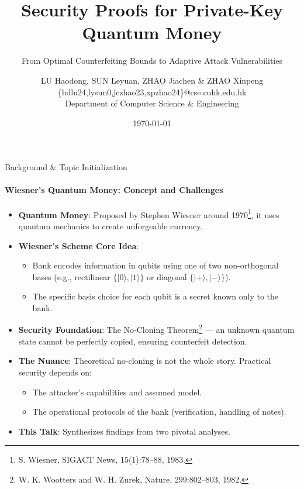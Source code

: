\documentclass{beamer}
\title[Wiesner's QM Security]{Security Proofs for Private-Key Quantum Money}
\subtitle{From Optimal Counterfeiting Bounds to Adaptive Attack Vulnerabilities}
\author[Your Short Name]{
    LU Haodong, SUN Leyuan, ZHAO Jiachen \& ZHAO Xinpeng \\
    \vspace{0.1in}
    \footnotesize{\{hdlu24,lysun0,jczhao23,xpzhao24\}@cse.cuhk.edu.hk} \\
    \footnotesize{Department of Computer Science \& Engineering}}
\institute[CUHK]{The Chinese University of Hong Kong}
\date{\today}
\begin{document}
\frame[plain]{\maketitle}


\begin{frame}{Background \& Topic Initialization}
    \framesubtitle{Wiesner's Quantum Money: Concept and Challenges}
    \begin{itemize}
        \item \textbf{Quantum Money}: Proposed by Stephen Wiesner around 1970\footnote{S. Wiesner, SIGACT News, 15(1):78–88, 1983.}, it uses quantum mechanics to create unforgeable currency.
        \pause
        \item \textbf{Wiesner's Scheme Core Idea}:
            \begin{itemize}
                \item Bank encodes information in qubits using one of two non-orthogonal bases (e.g., rectilinear $\{|0\rangle, |1\rangle\}$ or diagonal $\{|+\rangle, |-\rangle\}$).
                \item The specific basis choice for each qubit is a secret known only to the bank.
            \end{itemize}
        \pause
        \item \textbf{Security Foundation}: The No-Cloning Theorem\footnote{W. K. Wootters and W. H. Zurek, Nature, 299:802–803, 1982.} --- an unknown quantum state cannot be perfectly copied, ensuring counterfeit detection.
        \pause
        \item \textbf{The Nuance}: Theoretical no-cloning is not the whole story. Practical security depends on:
            \begin{itemize}
                \item The attacker's capabilities and assumed model.
                \item The operational protocols of the bank (verification, handling of notes).
            \end{itemize}
        \pause
        \item \textbf{This Talk}: Synthesizes findings from two pivotal analyses.
    \end{itemize}
\end{frame}
\end{document}
